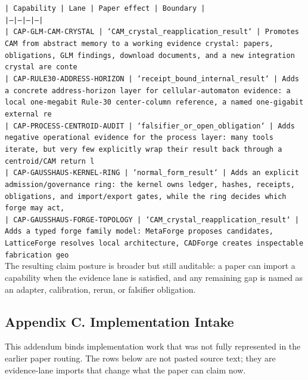 \documentclass[11pt]{article}
\begin{document}
\noindent\texttt{| Capability | Lane | Paper effect | Boundary |}\\
\noindent\texttt{|---|---|---|---|}\\
\noindent\texttt{| CAP-GLM-CAM-CRYSTAL | `CAM\_crystal\_reapplication\_result` | Promotes CAM from abstract memory to a working evidence crystal: papers, obligations, GLM findings, download documents, and a new integration crystal are conte}\\
\noindent\texttt{| CAP-RULE30-ADDRESS-HORIZON | `receipt\_bound\_internal\_result` | Adds a concrete address-horizon layer for cellular-automaton evidence: a local one-megabit Rule-30 center-column reference, a named one-gigabit external re}\\
\noindent\texttt{| CAP-PROCESS-CENTROID-AUDIT | `falsifier\_or\_open\_obligation` | Adds negative operational evidence for the process layer: many tools iterate, but very few explicitly wrap their result back through a centroid/CAM return l}\\
\noindent\texttt{| CAP-GAUSSHAUS-KERNEL-RING | `normal\_form\_result` | Adds an explicit admission/governance ring: the kernel owns ledger, hashes, receipts, obligations, and import/export gates, while the ring decides which forge may act,}\\
\noindent\texttt{| CAP-GAUSSHAUS-FORGE-TOPOLOGY | `CAM\_crystal\_reapplication\_result` | Adds a typed forge family model: MetaForge proposes candidates, LatticeForge resolves local architecture, CADForge creates inspectable fabrication geo}\\

The resulting claim posture is broader but still auditable: a paper can import a capability when the evidence lane is satisfied, and any remaining gap is named as an adapter, calibration, rerun, or falsifier obligation.

\subsection*{Appendix C. Implementation Intake}

This addendum binds implementation work that was not fully represented in the earlier paper routing. The rows below are not pasted source text; they are evidence-lane imports that change what the paper can claim now.
\end{document}
